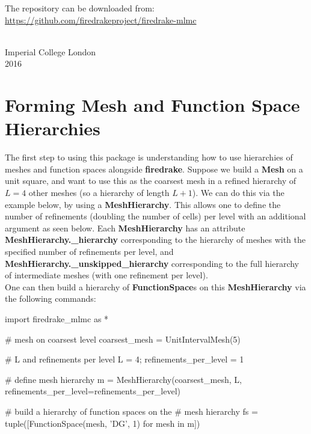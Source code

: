 \documentclass[10pt,letterpaper,extrafontsizes]{memoir}
\newcommand\svnidlong[4]{}
\newcommand\pythonclass[1]{\textbf{\color{deepred}#1}}
\begin{document}
    The repository can be downloaded from: \\
    \url{https://github.com/firedrakeproject/firedrake-mlmc}
    
{ \\ Imperial College London \\ 2016\par}


\svnidlong
{$Ignore: $}
{$LastChangedDate: 2015-04-22 17:17:51 +0200 (Wed, 22 Apr 2015) $}
{$LastChangedRevision: 527 $}
{$LastChangedBy: daleif $}

\chapter{Forming Mesh and Function Space Hierarchies}

The first step to using this package is understanding how to use hierarchies of meshes and function spaces alongside \textbf{firedrake}. Suppose we build a \pythonclass{Mesh} on a unit square, and want to use this as the coarsest mesh in a refined hierarchy of $L = 4$ other meshes (so a hierarchy of length $L + 1$). We can do this via the example below, by using a \pythonclass{MeshHierarchy}. This allows one to define the number of refinements (doubling the number of cells) per level with an additional argument as seen below. Each \pythonclass{MeshHierarchy} has an attribute \pythonclass{MeshHierarchy.\_hierarchy} corresponding to the hierarchy of meshes with the specified number of refinements per level, and \pythonclass{MeshHierarchy.\_unskipped\_hierarchy} corresponding to the full hierarchy of intermediate meshes (with one refinement per level). \\
One can then build a hierarchy of \pythonclass{FunctionSpace}s  on this \pythonclass{MeshHierarchy} via the following commands:\\

\begin{python}
import firedrake_mlmc as *

# mesh on coarsest level
coarsest_mesh = UnitIntervalMesh(5)

# L and refinements per level
L = 4; refinements_per_level = 1

# define mesh hierarchy
m = MeshHierarchy(coarsest_mesh, L,
                  refinements_per_level=refinements_per_level)

# build a hierarchy of function spaces on the
# mesh hierarchy
fs = tuple([FunctionSpace(mesh, 'DG', 1) for mesh in m])
\end{python}
\end{document}
